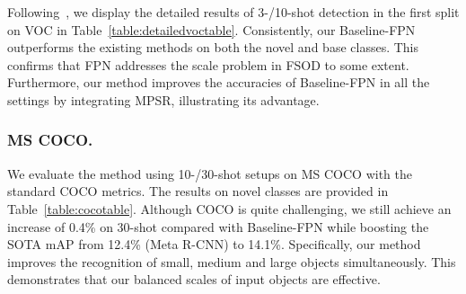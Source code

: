 \documentclass[runningheads]{llncs}
\begin{document}
Following~\cite{yolore,metarcnn}, we display the detailed results of 3-/10-shot detection in the first split on VOC in Table~\ref{table:detailedvoctable}. 
Consistently, our Baseline-FPN outperforms the existing methods on both the novel and base classes. 
This confirms that FPN addresses the scale problem in FSOD to some extent. 
Furthermore, our method improves the accuracies of Baseline-FPN in all the settings by integrating MPSR, illustrating its advantage.


\subsubsection{MS COCO.}
We evaluate the method using 10-/30-shot setups on MS COCO with the standard COCO metrics. The results on novel classes are provided in Table~\ref{table:cocotable}. 
Although COCO is quite challenging, we still achieve an increase of 0.4\% on 30-shot compared with Baseline-FPN while boosting the SOTA mAP from 12.4\% (Meta R-CNN) to 14.1\%.
Specifically, our method improves the recognition of small, medium and large objects simultaneously. 
This demonstrates that our balanced scales of input objects are effective.
\setlength{\tabcolsep}{0.2pt}
\end{document}
